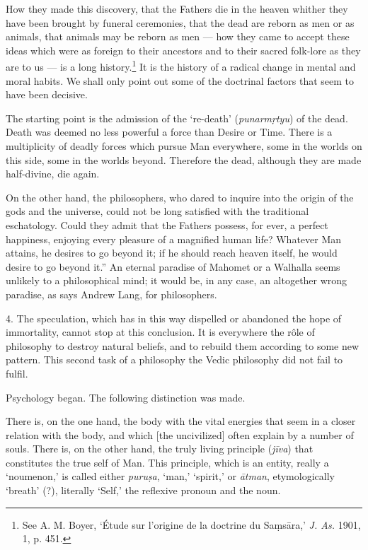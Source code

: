 \documentclass[a4paper, 11pt, oneside, english, landscape]{article}
\begin{document}
How they made this discovery, that the Fathers die in the heaven whither they have been brought by funeral ceremonies, that the dead are reborn as men or as animals, that animals may be reborn as men --- how they came to accept these ideas which were as foreign to their ancestors and to their sacred folk-lore as they are to us --- is a long history.\footnote{See A. M. Boyer, `Étude sur l'origine de la doctrine du Saṃsāra,' \emph{J. As.} 1901, 1, p. 451.} It is the history of a radical change in mental and moral habits. We shall only point out some of the doctrinal factors that seem to have been decisive.

The starting point is the admission of the `re-death' (\emph{punarmṛtyu}) of the dead. Death was deemed no less powerful a force than Desire or Time. There is a multiplicity of deadly forces which pursue Man everywhere, some in the worlds on this side, some in the worlds beyond. Therefore the dead, although they are made half-divine, die again.

On the other hand, the philosophers, who dared to inquire into the origin of the gods and the universe, could not be long satisfied with the traditional eschatology. Could they admit that the Fathers possess, for ever, a perfect happiness, enjoying every pleasure of a magnified human life? Whatever Man attains, he desires to go beyond it; if he should reach heaven itself, he would desire to go beyond it.'' An eternal paradise of Mahomet or a Walhalla seems unlikely to a philosophical mind; it would be, in any case, an altogether wrong paradise, as says Andrew Lang, for philosophers.

4. The speculation, which has in this way dispelled or abandoned the hope of immortality, cannot stop at this conclusion. It is everywhere the rôle of philosophy to destroy natural beliefs, and to rebuild them according to some new pattern. This second task of a philosophy the Vedic philosophy did not fail to fulfil.

Psychology began. The following distinction was made.

There is, on the one hand, the body with the vital energies that seem in a closer relation with the body, and which [the uncivilized] often explain by a number of souls. There is, on the other hand, the truly living principle (\emph{jīva}) that constitutes the true self of Man. This principle, which is an entity, really a `noumenon,' is called either \emph{puruṣa}, `man,' `spirit,' or \emph{ātman}, etymologically `breath' (?), literally `Self,' the reflexive pronoun and the noun.
\end{document}
